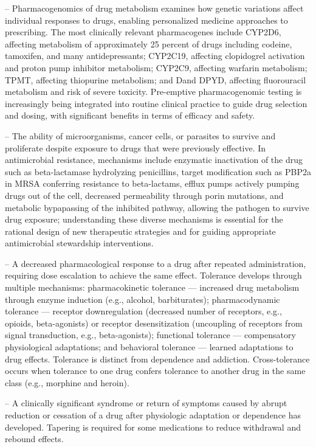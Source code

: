 -- Pharmacogenomics of drug metabolism examines how genetic variations affect individual responses to drugs, enabling personalized medicine approaches to prescribing. The most clinically relevant pharmacogenes include CYP2D6, affecting metabolism of approximately 25 percent of drugs including codeine, tamoxifen, and many antidepressants; CYP2C19, affecting clopidogrel activation and proton pump inhibitor metabolism; CYP2C9, affecting warfarin metabolism; TPMT, affecting thiopurine metabolism; and Dand DPYD, affecting fluorouracil metabolism and risk of severe toxicity. Pre-emptive pharmacogenomic testing is increasingly being integrated into routine clinical practice to guide drug selection and dosing, with significant benefits in terms of efficacy and safety.

-- The ability of microorganisms, cancer cells, or parasites to survive and proliferate despite exposure to drugs that were previously effective. In antimicrobial resistance, mechanisms include enzymatic inactivation of the drug such as beta-lactamase hydrolyzing penicillins, target modification such as PBP2a in MRSA conferring resistance to beta-lactams, efflux pumps actively pumping drugs out of the cell, decreased permeability through porin mutations, and metabolic bypapassing of the inhibited pathway, allowing the pathogen to survive drug exposure; understanding these diverse mechanisms is essential for the rational design of new therapeutic strategies and for guiding appropriate antimicrobial stewardship interventions.

-- A decreased pharmacological response to a drug after repeated administration, requiring dose escalation to achieve the same effect. Tolerance develops through multiple mechanisms: pharmacokinetic tolerance — increased drug metabolism through enzyme induction (e.g., alcohol, barbiturates); pharmacodynamic tolerance — receptor downregulation (decreased number of receptors, e.g., opioids, beta-agonists) or receptor desensitization (uncoupling of receptors from signal transduction, e.g., beta-agonists); functional tolerance — compensatory physiological adaptations; and behavioral tolerance — learned adaptations to drug effects. Tolerance is distinct from dependence and addiction. Cross-tolerance occurs when tolerance to one drug confers tolerance to another drug in the same class (e.g., morphine and heroin).

-- A clinically significant syndrome or return of symptoms caused by abrupt reduction or cessation of a drug after physiologic adaptation or dependence has developed. Tapering is required for some medications to reduce withdrawal and rebound effects.

